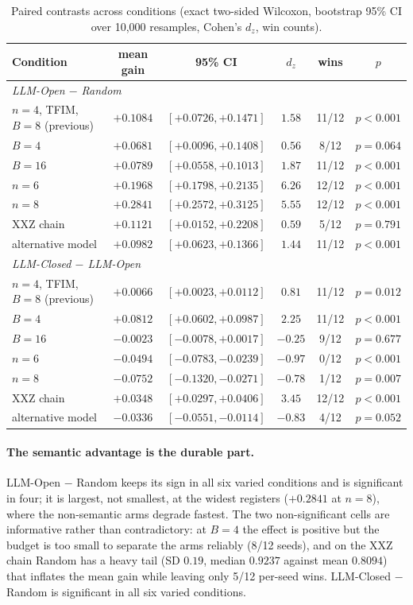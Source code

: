 \documentclass[11pt]{article}
\begin{document}
\begin{table}[t]
\centering\small
\caption{Paired contrasts across conditions (exact two-sided Wilcoxon,
bootstrap 95\% CI over 10{,}000 resamples, Cohen's $d_z$, win counts).}
\label{tab:robustness-contrasts}
\begin{tabular}{lccccc}
\toprule
Condition & mean gain & 95\% CI & $d_z$ & wins & $p$ \\
\midrule
\multicolumn{6}{l}{\textit{LLM-Open $-$ Random}}\\
$n{=}4$, TFIM, $B{=}8$ (previous) & $+0.1084$ & $[+0.0726, +0.1471]$ & $1.58$ & 11/12 & $p<0.001$ \\
$B{=}4$ & $+0.0681$ & $[+0.0096, +0.1408]$ & $0.56$ & 8/12 & $p=0.064$ \\
$B{=}16$ & $+0.0789$ & $[+0.0558, +0.1013]$ & $1.87$ & 11/12 & $p<0.001$ \\
$n{=}6$ & $+0.1968$ & $[+0.1798, +0.2135]$ & $6.26$ & 12/12 & $p<0.001$ \\
$n{=}8$ & $+0.2841$ & $[+0.2572, +0.3125]$ & $5.55$ & 12/12 & $p<0.001$ \\
XXZ chain & $+0.1121$ & $[+0.0152, +0.2208]$ & $0.59$ & 5/12 & $p=0.791$ \\
alternative model & $+0.0982$ & $[+0.0623, +0.1366]$ & $1.44$ & 11/12 & $p<0.001$ \\
\midrule
\multicolumn{6}{l}{\textit{LLM-Closed $-$ LLM-Open}}\\
$n{=}4$, TFIM, $B{=}8$ (previous) & $+0.0066$ & $[+0.0023, +0.0112]$ & $0.81$ & 11/12 & $p=0.012$ \\
$B{=}4$ & $+0.0812$ & $[+0.0602, +0.0987]$ & $2.25$ & 11/12 & $p<0.001$ \\
$B{=}16$ & $-0.0023$ & $[-0.0078, +0.0017]$ & $-0.25$ & 9/12 & $p=0.677$ \\
$n{=}6$ & $-0.0494$ & $[-0.0783, -0.0239]$ & $-0.97$ & 0/12 & $p<0.001$ \\
$n{=}8$ & $-0.0752$ & $[-0.1320, -0.0271]$ & $-0.78$ & 1/12 & $p=0.007$ \\
XXZ chain & $+0.0348$ & $[+0.0297, +0.0406]$ & $3.45$ & 12/12 & $p<0.001$ \\
alternative model & $-0.0336$ & $[-0.0551, -0.0114]$ & $-0.83$ & 4/12 & $p=0.052$ \\
\bottomrule
\end{tabular}
\end{table}

\paragraph{The semantic advantage is the durable part.}
LLM-Open $-$ Random keeps its sign in all six varied conditions and is
significant in four; it is largest, not smallest, at the widest registers
($+0.2841$ at $n=8$), where the non-semantic arms degrade fastest.
The two non-significant cells are informative rather than contradictory: at
$B=4$ the effect is positive but the budget is too small to separate the arms
reliably (8/12 seeds), and on the XXZ chain Random has a heavy tail
(SD $0.19$, median $0.9237$ against mean $0.8094$) that inflates the mean gain
while leaving only 5/12 per-seed wins.
LLM-Closed $-$ Random is significant in all six varied conditions.
\end{document}
